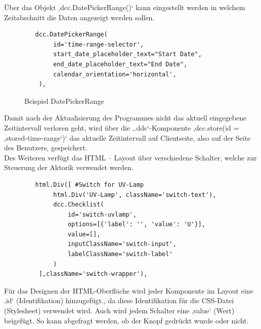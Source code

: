 \vspace{3mm}
Über das Objekt ‚dcc.DatePickerRange()‘ kann eingestellt werden in welchem Zeitabschnitt die Daten angezeigt werden sollen.
\begin{figure}[H]
    \centering
    \begin{verbatim}
   dcc.DatePickerRange(
        id='time-range-selector',
        start_date_placeholder_text="Start Date",
        end_date_placeholder_text="End Date",
        calendar_orientation='horizontal',
    ),
    \end{verbatim}
    \caption{Beispiel DatePickerRange}
\end{figure}
\vspace{3mm}
Damit nach der Aktualisierung des Programmes nicht das aktuell eingegebene Zeitintervall verloren geht, wird über die ‚.ddc‘-Komponente ‚dcc.store(id = ‚stored-time-range‘)‘ das aktuelle Zeitintervall auf Clientseite, also auf der Seite des Benutzers, gespeichert. \\
\vspace{3mm}
Des Weiteren verfügt das HTML – Layout über verschiedene Schalter, welche zur Steuerung der Aktorik verwendet werden. 
\begin{figure}[H]
    \centering
    \begin{verbatim}
   html.Div([ #Switch for UV-Lamp
        html.Div('UV-Lamp', className='switch-text'),
        dcc.Checklist(
            id='switch-uvlamp',
            options=[{'label': '', 'value': 'U'}],
            value=[],
            inputClassName='switch-input',
            labelClassName='switch-label'
        )
    ],className='switch-wrapper'), 
    \end{verbatim}
\end{figure}
Für das Designen der HTML-Oberfläche wird jeder Komponente im Layout eine ‚id‘ (Identifikation) hinzugefügt., da diese Identifikation für die CSS-Datei (Stylesheet) verwendet wird. Auch wird jedem Schalter eine ‚value‘ (Wert) beigefügt. So kann abgefragt werden, ob der Knopf gedrückt wurde oder nicht. 


